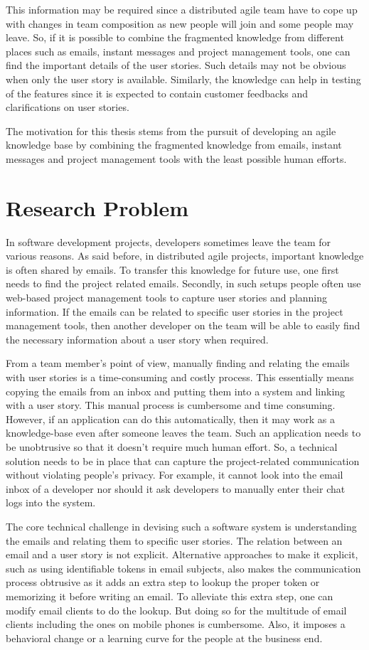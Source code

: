 This information may be required since a distributed agile team have to cope up with changes in team composition as new people will join and some people may leave. So, if it is possible to combine the fragmented knowledge from different places such as emails, instant messages and project management tools, one can find the important details of the user stories. Such details may not be obvious when only the user story is available. Similarly, the knowledge can help in testing of the features since it is expected to contain customer feedbacks and clarifications on user stories.

The motivation for this thesis stems from the pursuit of developing an agile knowledge base by combining the fragmented knowledge from emails, instant messages and project management tools with the least possible human efforts.

\section{Research Problem}
In software development projects, developers sometimes leave the team for various reasons. As said before, in distributed agile projects, important knowledge is often shared by emails. To transfer this knowledge for future use, one first needs to find the project related emails. Secondly, in such setups people often use web-based project management tools to capture user stories and planning information. If the emails can be related to specific user stories in the project management tools, then another developer on the team will be able to easily find the necessary information about a user story when required.

From a team member's point of view, manually finding and relating the emails with user stories is a time-consuming and costly process. This essentially means copying the emails from an inbox and putting them into a system and linking with a user story. This manual process is cumbersome and time consuming. However, if an application can do this automatically, then it may work as a knowledge-base even after someone leaves the team. Such an application needs to be unobtrusive so that it doesn't require much human effort. So, a technical solution needs to be in place that can capture the project-related communication without violating people's privacy. For example, it cannot look into the email inbox of a developer nor should it ask developers to manually enter their chat logs into the system.  

The core technical challenge in devising such a software system is understanding the emails and relating them to specific user stories. The relation between an email and a user story is not explicit. Alternative approaches to make it explicit, such as using identifiable tokens in email subjects, also makes the communication process obtrusive as it adds an extra step to lookup the proper token or memorizing it before writing an email. To alleviate this extra step, one can modify email clients to do the lookup. But doing so for the multitude of email clients including the ones on mobile phones is cumbersome. Also, it imposes a behavioral change or a learning curve for the people at the business end.

